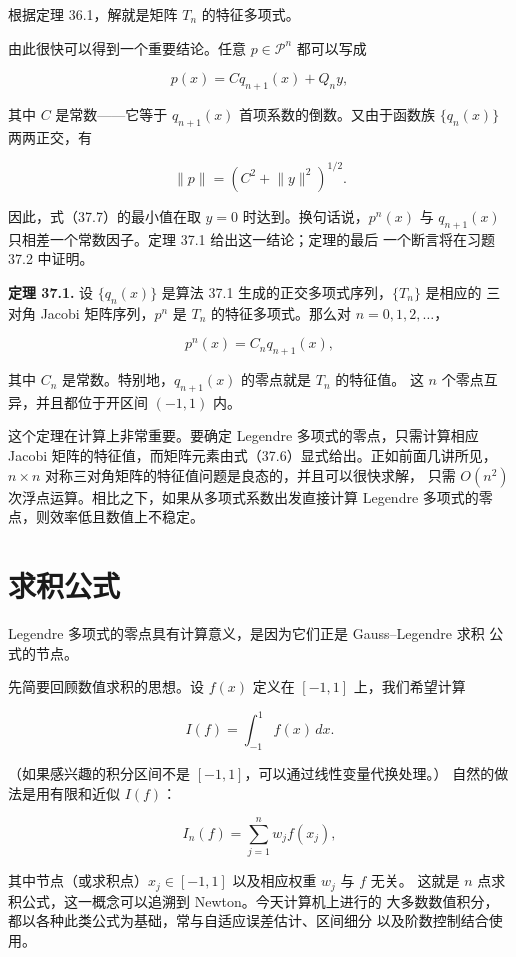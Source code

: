 \documentclass[UTF8,fontset=none,12pt]{ctexart}
\begin{document}
根据定理 36.1，解就是矩阵 $T_n$ 的特征多项式。

由此很快可以得到一个重要结论。任意 $p\in\mathcal P^n$ 都可以写成

\[
p(x)=Cq_{n+1}(x)+Q_ny,
\]

其中 $C$ 是常数——它等于 $q_{n+1}(x)$ 首项系数的倒数。又由于函数族
$\{q_n(x)\}$ 两两正交，有

\[
\lVert p\rVert=(C^2+\lVert y\rVert^2)^{1/2}.
\]

因此，式（37.7）的最小值在取 $y=0$ 时达到。换句话说，$p^n(x)$ 与
$q_{n+1}(x)$ 只相差一个常数因子。定理 37.1 给出这一结论；定理的最后
一个断言将在习题 37.2 中证明。

\textbf{定理 37.1.}
设 $\{q_n(x)\}$ 是算法 37.1 生成的正交多项式序列，$\{T_n\}$ 是相应的
三对角 Jacobi 矩阵序列，$p^n$ 是 $T_n$ 的特征多项式。那么对
$n=0,1,2,\ldots$，

\begin{equation}
p^n(x)=C_nq_{n+1}(x),
\tag{37.8}
\end{equation}

其中 $C_n$ 是常数。特别地，$q_{n+1}(x)$ 的零点就是 $T_n$ 的特征值。
这 $n$ 个零点互异，并且都位于开区间 $(-1,1)$ 内。

这个定理在计算上非常重要。要确定 Legendre 多项式的零点，只需计算相应
Jacobi 矩阵的特征值，而矩阵元素由式（37.6）显式给出。正如前面几讲所见，
$n\times n$ 对称三对角矩阵的特征值问题是良态的，并且可以很快求解，
只需 $O(n^2)$ 次浮点运算。相比之下，如果从多项式系数出发直接计算
Legendre 多项式的零点，则效率低且数值上不稳定。

\section*{求积公式}

Legendre 多项式的零点具有计算意义，是因为它们正是 Gauss--Legendre 求积
公式的节点。

先简要回顾数值求积的思想。设 $f(x)$ 定义在 $[-1,1]$ 上，我们希望计算

\begin{equation}
I(f)=\int_{-1}^{1}f(x)\,dx.
\tag{37.9}
\end{equation}

（如果感兴趣的积分区间不是 $[-1,1]$，可以通过线性变量代换处理。）
自然的做法是用有限和近似 $I(f)$：

\begin{equation}
I_n(f)=\sum_{j=1}^{n}w_jf(x_j),
\tag{37.10}
\end{equation}

其中节点（或求积点）$x_j\in[-1,1]$ 以及相应权重 $w_j$ 与 $f$ 无关。
这就是 $n$ 点求积公式，这一概念可以追溯到 Newton。今天计算机上进行的
大多数数值积分，都以各种此类公式为基础，常与自适应误差估计、区间细分
以及阶数控制结合使用。
\end{document}
